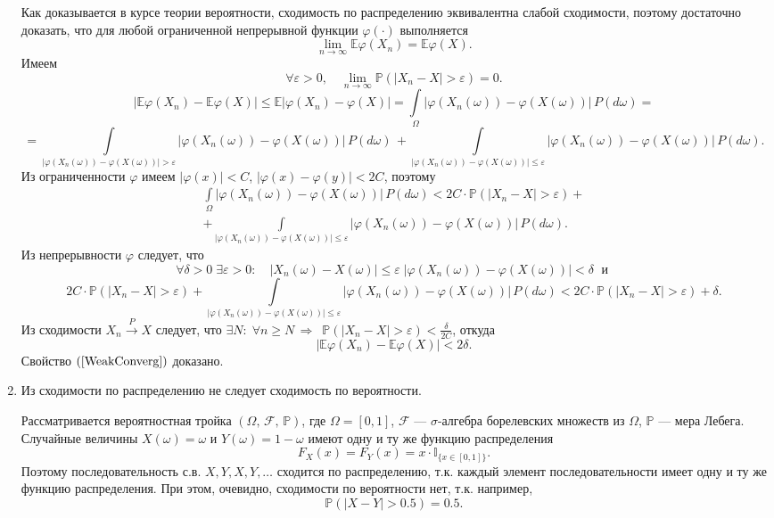 \begin{solution}
\begin{enumerate}
Как доказывается в курсе теории вероятности, сходимость по распределению эквивалентна слабой сходимости, поэтому достаточно доказать, что 
для любой ограниченной непрерывной функции $\varphi(\cdot)$ выполняется 
\begin{equation}
\label{WeakConverg}
\lim\limits_{n\to\infty} {\mathbb E}\varphi(X_n)={\mathbb E}\varphi(X) . 
\end{equation}
Имеем 
$$
\forall\varepsilon>0, \quad \lim\limits_{n\to\infty} {\mathbb P}(|X_n-X|>\varepsilon)=0 . 
$$
$$
|{\mathbb E}\varphi(X_n)-{\mathbb E}\varphi(X)|\leqslant {\mathbb E}|\varphi(X_n)-\varphi(X)|=\int\limits_{\Omega} 
|\varphi(X_n(\omega))-\varphi(X(\omega))|\, P(d\omega)=
$$
$$
=\int\limits_{|\varphi(X_n(\omega))-\varphi(X(\omega))|>\varepsilon}\!\!\!\! |\varphi(X_n(\omega))-\varphi(X(\omega))|\, P(d\omega)\, +
\int\limits_{|\varphi(X_n(\omega))-\varphi(X(\omega))|\leqslant\varepsilon}\!\!\!\! |\varphi(X_n(\omega))-\varphi(X(\omega))|\, P(d\omega). 
$$
Из ограниченности $\varphi$ имеем $|\varphi(x)|<C$, $|\varphi(x)-\varphi(y)|<2C$, поэтому 
\begin{multline*}
\int\limits_{\Omega} |\varphi(X_n(\omega))-\varphi(X(\omega))|\, P(d\omega)< 
2C\cdot {\mathbb P}(|X_n-X|>\varepsilon)+\\
+\int\limits_{|\varphi(X_n(\omega))-\varphi(X(\omega))|\leqslant\varepsilon} |\varphi(X_n(\omega))-\varphi(X(\omega))|\, P(d\omega) . 
\end{multline*}
Из непрерывности $\varphi$ следует, что 
$$
\forall\delta>0 \; \exists\varepsilon>0: 
\quad |X_n(\omega)-X(\omega)|\leqslant\varepsilon \; |\varphi(X_n(\omega))-\varphi(X(\omega))|<\delta \;\text{ и }
$$
$$
2C\cdot {\mathbb P}(|X_n-X|>\varepsilon)+
\int\limits_{|\varphi(X_n(\omega))-\varphi(X(\omega))|\leqslant\varepsilon} |\varphi(X_n(\omega))-\varphi(X(\omega))|\, P(d\omega)
<2C\cdot {\mathbb P}(|X_n-X|>\varepsilon)+\delta . 
$$
Из сходимости $X_n\xrightarrow{P}X$ следует, что $\exists N:\; \forall n\geqslant N\,\Rightarrow \, $ 
${\mathbb P}(|X_n-X|>\varepsilon)<\frac{\delta}{2C}$, откуда 
$$
|{\mathbb E}\varphi(X_n)-{\mathbb E}\varphi(X)|<2\delta . 
$$
Свойство $(\ref{WeakConverg})$ доказано. 

\item Из сходимости по распределению не следует сходимость по вероятности. 

Рассматривается вероятностная тройка $(\Omega,\, {\mathcal F},\, {\mathbb P})$, где $\Omega=[0, 1]$, 
${\mathcal F}$ --- $\sigma$-алгебра борелевских множеств из $\Omega$, ${\mathbb P}$ --- мера Лебега. 
Случайные величины $X(\omega)=\omega$ и $Y(\omega)=1-\omega$ имеют одну и ту же функцию распределения 
$$
F_X(x)=F_Y(x)=x\cdot {\mathbb I}_{\{ x\in[0,1]\}} . 
$$
Поэтому последовательность с.в. $X,Y,X,Y,\ldots$ сходится по распределению, т.к. каждый элемент последовательности имеет 
одну и ту же функцию распределения. При этом, очевидно, сходимости по вероятности нет, т.к. например, 
$$
{\mathbb P}(|X-Y|>0.5)=0.5 . 
$$


\end{enumerate}
\end{solution}

